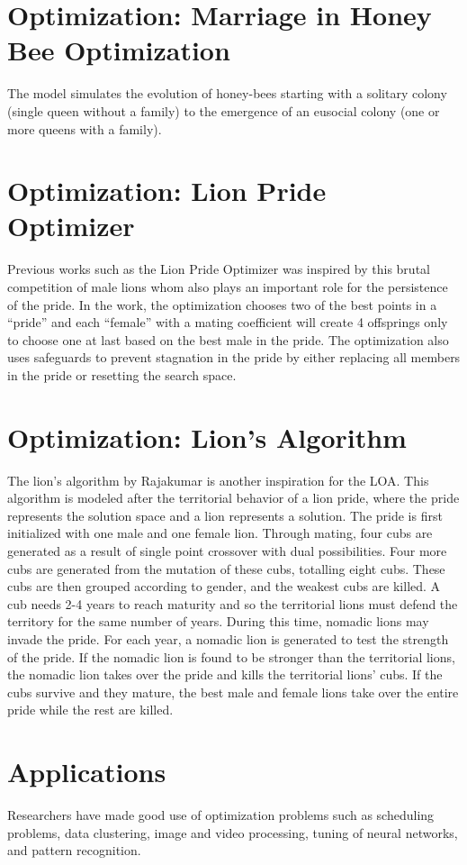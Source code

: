 \section{Optimization: Marriage in Honey Bee Optimization}
The model simulates the evolution of honey-bees starting with a solitary colony (single queen without a family) to the emergence of an eusocial colony (one or more queens with a family).

\section{Optimization: Lion Pride Optimizer}
Previous works such as the Lion Pride Optimizer was inspired by this brutal competition of male lions whom also plays an important role for the persistence of the pride. In the work, the optimization chooses two of the best points in a ``pride'' and each ``female'' with a mating coefficient will create 4 offsprings only to choose one at last based on the best male in the pride. The optimization also uses safeguards to prevent stagnation in the pride by either replacing all members in the pride or resetting the search space.

\section{Optimization: Lion's Algorithm}
The lion's algorithm by Rajakumar \cite{rajakumar_2012} is another inspiration for the LOA. This algorithm is modeled after the territorial behavior of a lion pride, where the pride represents the solution space and a lion represents a solution. The pride is first initialized with one male and one female lion. Through mating, four cubs are generated as a result of single point crossover with dual possibilities. Four more cubs are generated from the mutation of these cubs, totalling eight cubs. These cubs are then grouped according to gender, and the weakest cubs are killed. A cub needs 2-4 years to reach maturity and so the territorial lions must defend the territory for the same number of years. During this time, nomadic lions may invade the pride. For each year, a nomadic lion is generated to test the strength of the pride. If the nomadic lion is found to be stronger than the territorial lions, the nomadic lion takes over the pride and kills the territorial lions' cubs. If the cubs survive and they mature, the best male and female lions take over the entire pride while the rest are killed.

\section{Applications}
Researchers have made good use of optimization problems such as scheduling problems, data clustering, image and video processing, tuning of neural networks, and pattern recognition.


